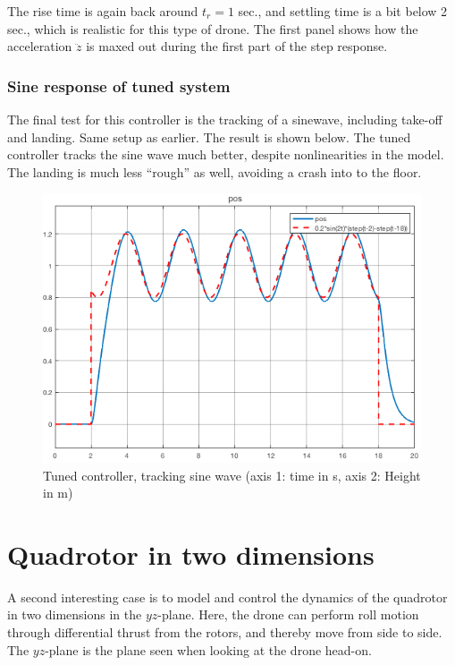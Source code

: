 \documentclass[a4paper]{report}
\begin{document}
The rise time is again back around $t_r = 1$ sec.,
and settling time is a bit below 2 sec., which is realistic for this type of drone. 
The first panel shows how the acceleration $\ddot{z}$ is maxed out during the first part of the step response.

\subsection{Sine response of tuned system}
The final test for this controller is the tracking of a sinewave, including take-off and landing. Same setup as earlier. The result is shown below.
The tuned controller tracks the sine wave much better, despite nonlinearities in the model.
The landing is much less ``rough'' as well, avoiding a crash into to the floor.

\begin{figure}[H]
\centering
\includegraphics[width=12cm]{img/sin_1d_nonlin_tuned.png}
\caption{Tuned controller, tracking sine wave (axis 1: time in \si{\second}, axis 2: Height in \si{\meter})\label{fig:sin_1d_nonlin_tuned}}
\end{figure}

\newpage
\chapter{Quadrotor in two dimensions}

A second interesting case is to model and control the dynamics of the quadrotor in two dimensions in the $yz$-plane.
Here, the drone can perform roll motion through differential thrust from the rotors, and thereby move from side to side.
The $yz$-plane is the plane seen when looking at the drone head-on. 
\end{document}
